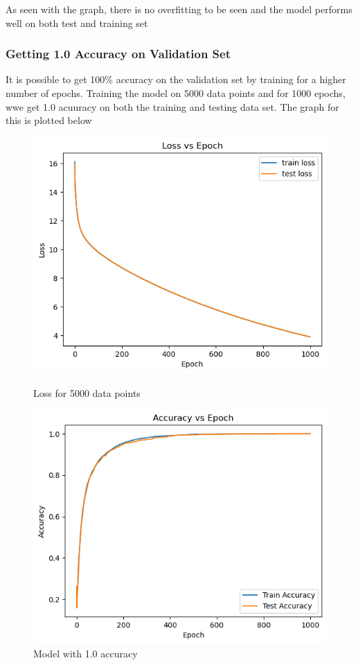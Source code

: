 \documentclass{article}
\begin{document}
\noindent As seen with the graph, there is no overfitting to be seen and the model performs well on both test and training set
\subsubsection*{Getting 1.0 Accuracy on Validation Set}
It is possible to get 100\% accuracy on the validation set by training for a higher number of epochs.
Training the model on 5000 data points and for 1000 epochs, wwe get 1.0 acuuracy on both the training and testing data set. The graph for this is plotted below
\begin{figure}[H]
    \centering
    \begin{minipage}{0.45\textwidth}
        \centering
        \includegraphics[width=1\textwidth]{loss_1.0.png} %
        \caption{Loss for 5000 data points}
    \end{minipage}\hfill
    \begin{minipage}{0.45\textwidth}
        \centering
        \includegraphics[width=1\textwidth]{accuracy_1.0.png} %
        \caption{Model with 1.0 accuracy}
    \end{minipage}
\end{figure}
\end{document}
